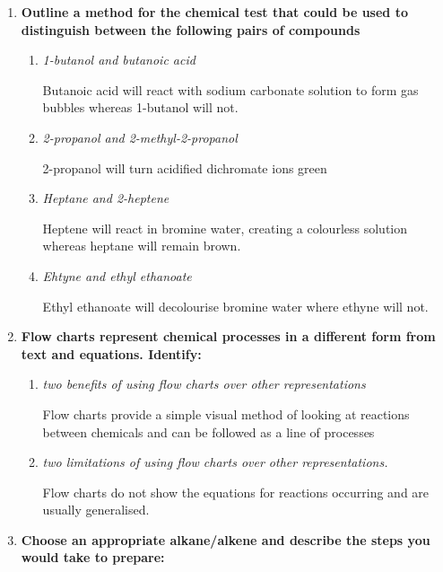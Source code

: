 \documentclass{report}
\begin{document}
\begin{enumerate}
\begin{enumerate}
			\end{enumerate}

		\item \textbf{Outline a method for the chemical test that could be used to distinguish between the following pairs of compounds}

			\begin{enumerate}
				\item \textit{1-butanol and butanoic acid}

					Butanoic acid will react with sodium carbonate solution to form gas bubbles whereas 1-butanol will not.

				\item \textit{2-propanol and 2-methyl-2-propanol}

					2-propanol will turn acidified dichromate ions green

				\item \textit{Heptane and 2-heptene}

					Heptene will react in bromine water, creating a colourless solution whereas heptane will remain brown.

				\item \textit{Ehtyne and ethyl ethanoate}

					Ethyl ethanoate will decolourise bromine water where ethyne will not.
			\end{enumerate}

		\item \textbf{Flow charts represent chemical processes in a different form from text and equations. Identify:}

			\begin{enumerate}
				\item \textit{two benefits of using flow charts over other representations}

					Flow charts provide a simple visual method of looking at reactions between chemicals and can be followed as a line of processes

				\item \textit{two limitations of using flow charts over other representations.}

					Flow charts do not show the equations for reactions occurring and are usually generalised.
			\end{enumerate}

		\item \textbf{Choose an appropriate alkane/alkene and describe the steps you would take to prepare:}


\end{enumerate}
\end{document}

